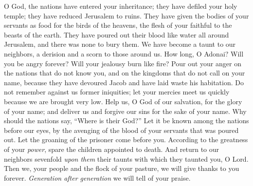 \begin{biblechapter} %
 O God, the nations have entered your inheritance; 
they have defiled your holy temple; 
they have reduced Jerusalem to ruins.
\verse They have given the bodies of your servants 
as food for the birds of the heavens, 
the flesh of your faithful to the beasts of the earth.
\verse They have poured out their blood like water 
all around Jerusalem, 
and there was none to bury them.
\verse We have become a taunt to our neighbors, 
a derision and a scorn to those around us.
\verse How long, O Adonai? Will you be angry forever? 
Will your jealousy burn like fire?
\verse Pour out your anger on the nations 
that do not know you, 
and on the kingdoms 
that do not call on your name,
\verse because they have devoured Jacob 
and have laid waste his habitation.
\verse Do not remember against us former iniquities; 
let your mercies meet us quickly 
because we are brought very low.
\verse Help us, O God of our salvation, 
for the glory of your name; 
and deliver us and forgive our sins 
for the sake of your name.
\verse Why should the nations say, 
“Where is their God?” 
Let it be known among the nations before our eyes, 
by the avenging of the blood of your servants 
that was poured out.
\verse Let the groaning of the prisoner come before you. 
According to the greatness of your \textit{power}, 
spare the children appointed to death.
\verse And return to our neighbors sevenfold \textit{upon them} 
their taunts with which they taunted you, O Lord.
\verse Then we, your people and the flock of your pasture, 
we will give thanks to you forever. 
\textit{Generation after generation} 
we will tell of your praise.
\end{biblechapter}

